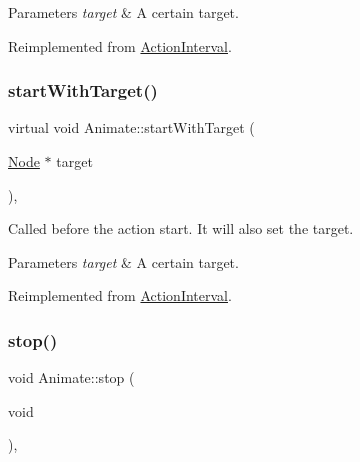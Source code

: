 \begin{DoxyParams}{Parameters}
{\em target} & A certain target. \\
\hline
\end{DoxyParams}


Reimplemented from \hyperlink{classActionInterval_ad3d91186b2c3108488ddbbdbbd982484}{Action\+Interval}.

\mbox{\label{classAnimate_a44376cdc03073bcba141e3ec309622f7}} 
\subsubsection{\texorpdfstring{start\+With\+Target()}{startWithTarget()}\hspace{0.1cm}{\footnotesize\ttfamily [2/2]}}
{\footnotesize\ttfamily virtual void Animate\+::start\+With\+Target (\begin{DoxyParamCaption}\item[{\hyperlink{classNode}{Node} $\ast$}]{target }\end{DoxyParamCaption})\hspace{0.3cm}{\ttfamily [override]}, {\ttfamily [virtual]}}

Called before the action start. It will also set the target.


\begin{DoxyParams}{Parameters}
{\em target} & A certain target. \\
\hline
\end{DoxyParams}


Reimplemented from \hyperlink{classActionInterval_ad3d91186b2c3108488ddbbdbbd982484}{Action\+Interval}.

\mbox{\label{classAnimate_a546b7b7817303ad58f57c6c97d64c4ed}} 
\subsubsection{\texorpdfstring{stop()}{stop()}\hspace{0.1cm}{\footnotesize\ttfamily [1/2]}}
{\footnotesize\ttfamily void Animate\+::stop (\begin{DoxyParamCaption}\item[{void}]{ }\end{DoxyParamCaption})\hspace{0.3cm}{\ttfamily [override]}, {\ttfamily [virtual]}}


